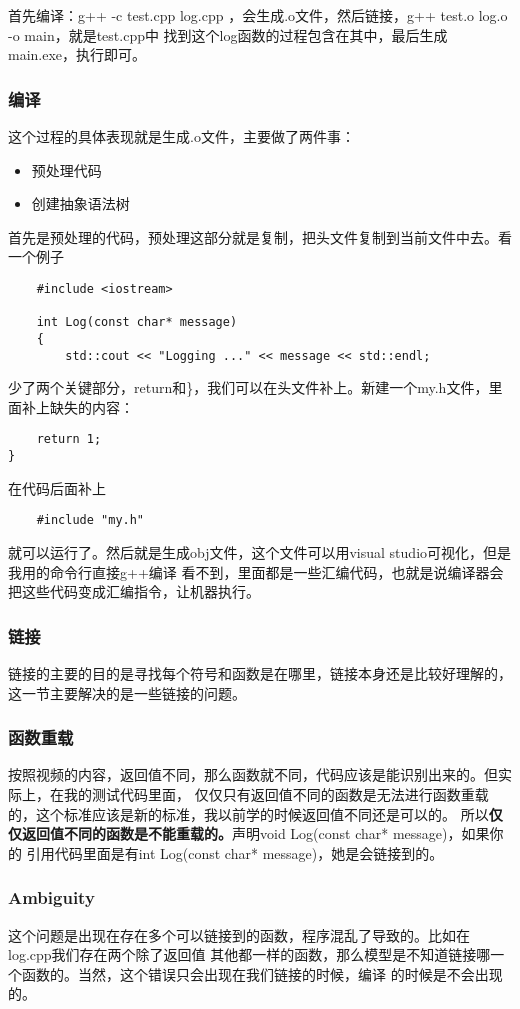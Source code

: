 \documentclass{article}
\begin{document}
\begin{sloppypar}
首先编译：g++ -c test.cpp log.cpp ，会生成.o文件，然后链接，g++ test.o log.o -o main，就是test.cpp中
找到这个log函数的过程包含在其中，最后生成main.exe，执行即可。

\subsubsection{编译}
这个过程的具体表现就是生成.o文件，主要做了两件事：
\begin{itemize}
	\item 预处理代码
	\item 创建抽象语法树	 
\end{itemize}

首先是预处理的代码，预处理这部分就是复制，把头文件复制到当前文件中去。看一个例子
\begin{lstlisting}
	#include <iostream>

	int Log(const char* message)
	{
		std::cout << "Logging ..." << message << std::endl;	
\end{lstlisting}
少了两个关键部分，return和\}，我们可以在头文件补上。新建一个my.h文件，里面补上缺失的内容：
\begin{lstlisting}
    return 1;
}
\end{lstlisting}
在代码后面补上
\begin{lstlisting}
	#include "my.h"
\end{lstlisting}
就可以运行了。然后就是生成obj文件，这个文件可以用visual studio可视化，但是我用的命令行直接g++编译
看不到，里面都是一些汇编代码，也就是说编译器会把这些代码变成汇编指令，让机器执行。

\subsubsection{链接}
链接的主要的目的是寻找每个符号和函数是在哪里，链接本身还是比较好理解的，这一节主要解决的是一些链接的问题。
  
\subsubsection{函数重载}
按照视频的内容，返回值不同，那么函数就不同，代码应该是能识别出来的。但实际上，在我的测试代码里面，
仅仅只有返回值不同的函数是无法进行函数重载的，这个标准应该是新的标准，我以前学的时候返回值不同还是可以的。
所以\textbf{仅仅返回值不同的函数是不能重载的。}声明void Log(const char* message)，如果你的
引用代码里面是有int Log(const char* message)，她是会链接到的。

\subsubsection{Ambiguity}
这个问题是出现在存在多个可以链接到的函数，程序混乱了导致的。比如在log.cpp我们存在两个除了返回值
其他都一样的函数，那么模型是不知道链接哪一个函数的。当然，这个错误只会出现在我们链接的时候，编译
的时候是不会出现的。


\end{sloppypar}
\end{document}
